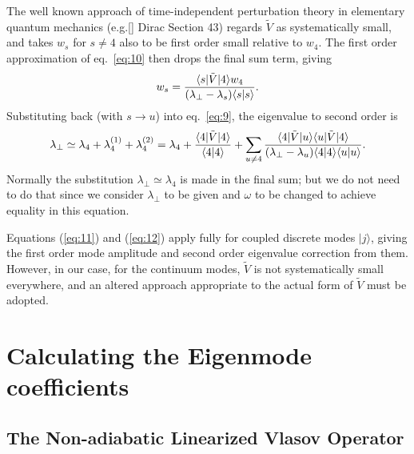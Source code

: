 \documentclass[12pt]{article}
\def\ket#1{|#1\rangle}
\def\bra#1{\langle#1}
\begin{document}
The well known approach of time-independent perturbation theory in
elementary quantum mechanics (e.g.[] Dirac Section 43) regards $\tilde{V}$ as
systematically small, and takes $w_s$ for $s\not=4$ also to be first
order small relative to $w_4$. The first order approximation of eq.\
\ref{eq:10} then drops the final sum term, giving
\begin{equation}
  \label{eq:11}
  w_s = {\bra{s}|\tilde{V}\ket{4}w_4\over (\lambda_\perp-\lambda_s)\bra{s}\ket{s}}.
\end{equation}
Substituting back (with $s\to u$) into eq.\ \ref{eq:9}, the
eigenvalue to second order is
\begin{equation}
  \label{eq:12}
 \lambda_\perp\simeq \lambda_4+\lambda_{4}^{(1)}+\lambda_{4}^{(2)}=\lambda_4
  +{\bra{4}|\tilde{V}\ket{4}\over \bra{4}\ket{4}}
    +\sum_{u\not=4}
    {\bra{4}|\tilde{V}\ket{u}\bra{u}|\tilde{V}\ket{4}\over
      (\lambda_\perp-\lambda_u)\bra{4}\ket{4}\bra{u}\ket{u}}.
\end{equation}
Normally the substitution $\lambda_\perp\simeq\lambda_4$ is made in
the final sum; but we do not need to do that since we consider
$\lambda_\perp$ to be given and $\omega$ to be changed to achieve
equality in this equation.

Equations (\ref{eq:11}) and (\ref{eq:12}) apply fully for coupled
discrete modes $\ket{j}$, giving the first order mode amplitude and
second order eigenvalue correction from them.  However, in our case,
for the continuum modes, $\tilde{V}$ is not systematically small
everywhere, and an altered approach appropriate to the actual form of
$\tilde{V}$ must be adopted.


\section{Calculating the Eigenmode coefficients}
\subsection{The Non-adiabatic Linearized Vlasov Operator}
\end{document}
